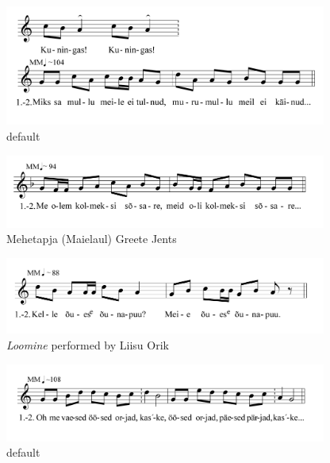 \begin{figure}[htbp]
\begin{center}
\includegraphics[width=300pt]{figures/094.png}
\caption{default}
\label{94}
\end{center}
\end{figure}


\begin{figure}[htbp]
\begin{center}
\includegraphics[width=300pt]{figures/081.png}
\caption{Mehetapja (Maielaul) Greete Jents}
\label{81}
\end{center}
\end{figure}


\begin{figure}[htbp]
\begin{center}
\includegraphics[width=300pt]{figures/077.png}
\caption{{\it Loomine} performed by Liisu Orik }
\label{77}
\end{center}
\end{figure}

\begin{figure}[htbp]
\begin{center}
\includegraphics[width=300pt]{figures/069.png}
\caption{default}
\label{default}
\end{center}
\end{figure}

